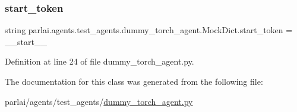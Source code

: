 \subsubsection{\texorpdfstring{start\+\_\+token}{start\_token}}
{\footnotesize\ttfamily string parlai.\+agents.\+test\+\_\+agents.\+dummy\+\_\+torch\+\_\+agent.\+Mock\+Dict.\+start\+\_\+token = \textquotesingle{}\+\_\+\+\_\+start\+\_\+\+\_\+\textquotesingle{}\hspace{0.3cm}{\ttfamily [static]}}



Definition at line 24 of file dummy\+\_\+torch\+\_\+agent.\+py.



The documentation for this class was generated from the following file\+:\begin{DoxyCompactItemize}
\item 
parlai/agents/test\+\_\+agents/\hyperlink{dummy__torch__agent_8py}{dummy\+\_\+torch\+\_\+agent.\+py}\end{DoxyCompactItemize}
